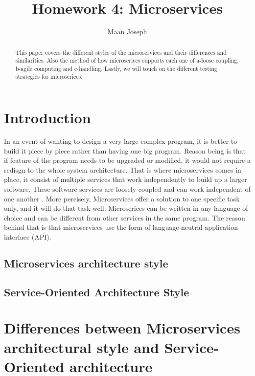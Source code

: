 \documentclass{IEEEtran}
\title{Homework 4: Microservices}
\author{Maan Joseph}
\begin{document}
	\maketitle
	\begin{abstract}
		This paper covers the different styles of the microservices and their differences and similarities. Also the method of how microserices supports each one of a-loose coupling, b-agile computing and c-handling. Lastly, we will touch on the different testing strategies for microserices.   
	\end{abstract}

	\section{Introduction}
		In an event of wanting to design a very large complex program, it is better to build it piece by piece rather than having one big program. Reason being is that if feature of the program needs to be upgraded or modified, it would not require a redisgn to the whole system architecture. That is where microservices comes in place, it consist of multiple services that work independently to build up a larger software. These software services are loosely coupled and can work independent of one another \cite{ibmred}. More percisely, Microservices offer a solution to one specific task only, and it will do that task well. Microserices can be written in any language of choice and can be different from other services in the same program. The reason behind that is that microservices use the form of language-neutral application interface (API).


		\subsection{Microservices architecture style}
		\subsection{Service-Oriented Architecture Style}

	\section{Differences between Microservices architectural style and Service-Oriented architecture}




	\newpage
	
	
\end{document}
